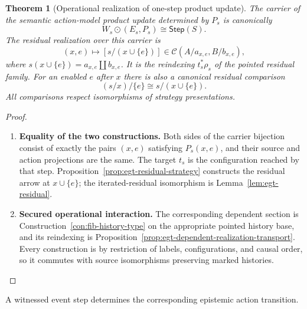 \documentclass[11pt,a4paper]{article}
\numberwithin{equation}{section}
\newtheorem{theorem}{Theorem}[section]
\theoremstyle{definition}
\theoremstyle{remark}
\theoremstyle{plain}
\begin{document}
\begin{theorem}[Operational realization of one-step product update]
\label{thm:egt-operational-action-correspondence}
The carrier of the semantic action-model product update determined by
$P_s$ is canonically
\begin{equation}\label{eq:egt-operational-action-carrier}
 W_s\odot(E_s,P_s)\cong\mathsf{Step}(S).
\end{equation}
The residual realization over this carrier is
\begin{equation}\label{eq:egt-operational-updated-residual}
 (x,e)\longmapsto [s/(x\cup\{e\})]
 \in\mathcal C(A/a_{x,e},B/b_{x,e}),
\end{equation}
where $s(x\cup\{e\})=a_{x,e}\amalg b_{x,e}$. It is the reindexing
$t_s^*\rho_s$ of the pointed residual family. For an enabled $e$ after
$x$ there is also a canonical residual comparison
\[
 (s/x)/\{e\}\cong s/(x\cup\{e\}).
\]
All comparisons respect isomorphisms of strategy presentations.
\end{theorem}
\begin{proof}
\leavevmode
\begin{enumerate}[label=\textup{(\arabic*)},leftmargin=*,itemsep=4pt,topsep=3pt]
  \item \textbf{Equality of the two constructions.} Both sides of the carrier bijection consist of exactly the pairs
$(x,e)$ satisfying $P_s(x,e)$, and their source and action projections
are the same. The target $t_s$ is the configuration reached by that
step. Proposition~\ref{prop:egt-residual-strategy} constructs the
residual arrow at $x\cup\{e\}$; the iterated-residual isomorphism is
Lemma~\ref{lem:egt-residual}.
  \item \textbf{Secured operational interaction.} The corresponding dependent section is
Construction~\ref{con:fib-history-type} on the appropriate pointed
history base, and its reindexing is
Proposition~\ref{prop:egt-dependent-realization-transport}. Every
construction is by restriction of labels, configurations, and causal
order, so it commutes with source isomorphisms preserving marked
histories.
\end{enumerate}
\end{proof}

\noindent A witnessed event step determines the corresponding epistemic action transition.
\begin{center}
\end{center}
\end{document}
